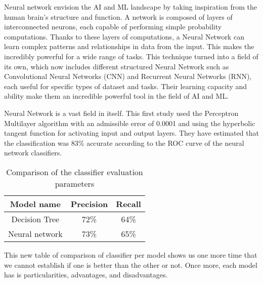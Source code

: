 \documentclass[../../../main.tex]{subfiles}
\begin{document}
Neural network envision the AI and ML landscape by taking inspiration from the human brain's structure and function. A network is composed of layers of interconnected neurons, each capable of performing simple probability computations. Thanks to these layers of computations, a Neural Network can learn complex patterns and relationships in data from the input. This makes the incredibly powerful for a wide range of tasks. 
This technique turned into a field of its own, which now includes different structured Neural Network such as Convolutional Neural Networks (CNN) and Recurrent Neural Networks (RNN), each useful for specific types of dataset and tasks. Their learning capacity and ability make them an incredible powerful tool in the field of AI and ML. 

Neural Network is a vast field in itself. This first study used the Perceptron Multilayer algorithm with an admissible error of 0.0001 and using the hyperbolic tangent function for activating input and output layers\cite{viloria_integration_2019}. They have estimated that the classification was 83\% accurate according to the ROC curve of the neural network classifiers.
\begin{table}[H]
    \centering
    \caption{Comparison of the classifier evaluation parameters\cite{viloria_integration_2019}}
    \begin{tabular}{|c|c|c|}
        \hline
        \textbf{Model name} & \textbf{Precision}  & \textbf{Recall}\\
        \hline
        Decision Tree & 72\% & 64\% \\
        \hline
        Neural network & 73\% & 65\% \\
        \hline
    \end{tabular}
    \label{tab:comparaison_classifier_eval_param_viloria}
\end{table}

This new table of comparison of classifier per model shows us one more time that we cannot establish if one is better than the other or not. Once more, each model has is particularities, advantages, and disadvantages. 
\end{document}
